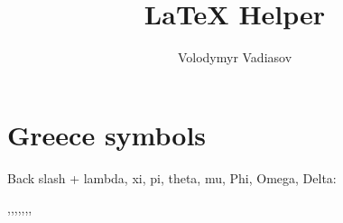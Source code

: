 \documentclass{exam}
\author{Volodymyr Vadiasov}
\title{LaTeX Helper}
\begin{document}
    \maketitle

    \section{Greece symbols}\label{sec:Greece symbols}
     Back slash + lambda, xi, pi, theta, mu, Phi, Omega, Delta:

    \lambda,\xi,\pi,\theta,\mu,\Phi,\Omega,\Delta
\end{document}
